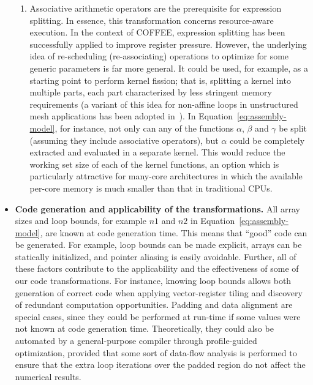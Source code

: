 \begin{itemize}
\begin{enumerate}
\item Associative arithmetic operators are the prerequisite for expression splitting. In essence, this transformation concerns resource-aware execution. In the context of COFFEE, expression splitting has been successfully applied to improve register pressure. However, the underlying idea of re-scheduling (re-associating) operations to optimize for some generic parameters is far more general. It could be used, for example, as a starting point to perform kernel fission; that is, splitting a kernel into multiple parts, each part characterized by less stringent memory requirements (a variant of this idea for non-affine loops in unstructured mesh applications has been adopted in~\citep{op2-lcpc}). In Equation~\eqref{eq:assembly-model}, for instance, not only can any of the functions $\alpha$, $\beta$ and $\gamma$ be split (assuming they include associative operators), but $\alpha$ could be completely extracted and evaluated in a separate kernel. This would reduce the working set size of each of the kernel functions, an option which is particularly attractive for many-core architectures in which the available per-core memory is much smaller than that in traditional CPUs.
\end{enumerate}
\item \textbf{Code generation and applicability of the transformations.} All array sizes and loop bounds, for example $n1$ and $n2$ in Equation~\ref{eq:assembly-model}, are known at code generation time. This means that ``good'' code can be generated. For example, loop bounds can be made explicit, arrays can be statically initialized, and pointer aliasing is easily avoidable. Further, all of these factors contribute to the applicability and the effectiveness of some of our code transformations. For instance, knowing loop bounds allows both generation of correct code when applying vector-register tiling and discovery of redundant computation  opportunities. Padding and data alignment are special cases, since they could be performed at run-time if some values were not known at code generation time. Theoretically, they could also be automated by a general-purpose compiler through profile-guided optimization, provided that some sort of data-flow analysis is performed to ensure that the extra loop iterations over the padded region do not affect the numerical results. 

\end{itemize}
